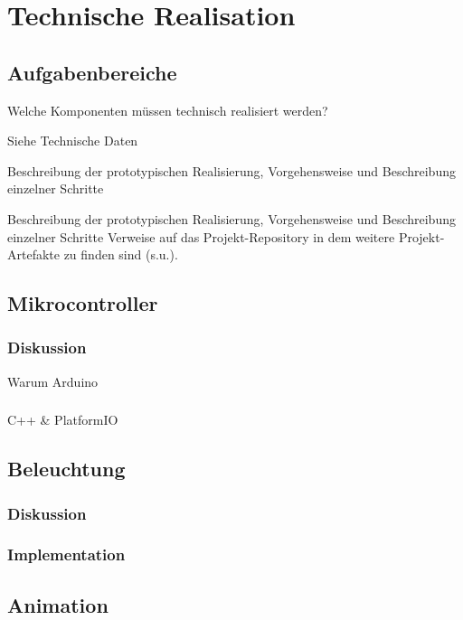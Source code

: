 \chapter{Technische Realisation}

\section{Aufgabenbereiche}

    Welche Komponenten müssen technisch realisiert werden? 


    Siehe Technische Daten

    Beschreibung der prototypischen Realisierung, Vorgehensweise und
    Beschreibung einzelner Schritte


    Beschreibung der prototypischen Realisierung, Vorgehensweise und Beschreibung einzelner Schritte
    Verweise auf das Projekt-Repository in dem weitere Projekt-Artefakte zu finden sind (s.u.).


\section{Mikrocontroller}
    \subsection{Diskussion}
        Warum Arduino

    \subsection{}
        C++ \& PlatformIO

\section{Beleuchtung}
    \subsection{Diskussion}

    \subsection{Implementation}

\section{Animation}
